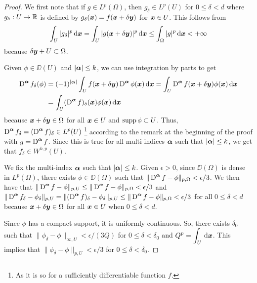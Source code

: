 \begin{proof}
We first note that if $\displaystyle g \in L^p(\Omega)$, then
$\displaystyle g_\delta \in L^p(U)$ for $0 \leq \delta <d$ where
$g_\delta:U \to \mathbb{R}$ is defined by
$g_\delta({\bm{x}}) = f({\bm{x}} + \delta {\bm{y}})$
for ${\bm{x}} \in U$.  This follows from
\[
\int_U |g_\delta|^p \,\mathrm{d}{{\bm{x}}}
= \int_U |g({\bm{x}} + \delta{\bm{y}})|^p \,\mathrm{d}{{\bm{x}}}
\leq \int_{\Omega} |g|^p \,\mathrm{d}{{\bm{x}}} < +\infty
\]
because $\delta {\bm{y}} + U \subset \Omega$.

Given $\phi \in \DD(U)$ and $|{\bm{\alpha}}| \leq k$, we can use integration by
parts to get
\begin{align*}
\operatorname{D}^{{\bm{\alpha}}} f_\delta (\phi)
&= (-1)^{|{\bm{\alpha}}|} \int_U f({\bm{x}}+\delta{\bm{y}})
\operatorname{D}^{{\bm{\alpha}}} \phi({\bm{x}}) \,\mathrm{d}{{\bm{x}}}
= \int_U \operatorname{D}^{{\bm{\alpha}}} f({\bm{x}}+\delta{\bm{y}}) \phi({\bm{x}})
\,\mathrm{d}{{\bm{x}}} \\
&= \int_U (\operatorname{D}^{{\bm{\alpha}}} f)_\delta({\bm{x}}) \phi({\bm{x}}) \,\mathrm{d}{{\bm{x}}}
\end{align*}
because ${\bm{x}}+\delta{\bm{y}} \in \Omega$ for all ${\bm{x}} \in U$
and $\operatorname{supp} \phi \subset U$.  Thus, 
$\displaystyle \operatorname{D}^{{\bm{\alpha}}} f_\delta
= (\operatorname{D}^{{\bm{\alpha}}} f)_\delta \in L^p(U)$
\footnote{As it is so for a sufficiently differentiable function $f$.}
according to the remark at the beginning of the proof with
$\displaystyle g = \operatorname{D}^{{\bm{\alpha}}} f$.  Since this is true for all
multi-indices ${\bm{\alpha}}$ such that $|{\bm{\alpha}}|\leq k$, we get that
$\displaystyle f_\delta \in W^{k,p}(U)$.

We fix the multi-index ${\bm{\alpha}}$ such that $|{\bm{\alpha}}|\leq k$.
Given $\epsilon >0$, since $\DD(\Omega)$ is dense in
$\displaystyle L^p(\Omega)$, there exists $\phi \in \DD(\Omega)$
such that
$\displaystyle \|\operatorname{D}^{{\bm{\alpha}}} f - \phi\|_{p,\Omega} < \epsilon/3$.
We then have that
$\displaystyle \|\operatorname{D}^{{\bm{\alpha}}} f - \phi\|_{p,U} \leq
\|\operatorname{D}^{{\bm{\alpha}}} f - \phi\|_{p,\Omega} < \epsilon/3$
and
$\displaystyle \|\operatorname{D}^{{\bm{\alpha}}} f_\delta - \phi_\delta \|_{p,U}
= \| (\operatorname{D}^{{\bm{\alpha}}} f)_\delta - \phi_\delta \|_{p,U}
\leq \|\operatorname{D}^{{\bm{\alpha}}} f - \phi\|_{p,\Omega} < \epsilon/3$
for all $0\leq \delta < d$
because ${\bm{x}}+\delta{\bm{y}} \in \Omega$ for all ${\bm{x}} \in U$
when $0\leq \delta < d$.

Since $\phi$ has a compact support, it is uniformly continuous.
So, there exists $\delta_0$ such that
$\| \phi_\delta - \phi\|_{\infty,U} < \epsilon/(3Q)$
for $0 \leq \delta < \delta_0$ and
$\displaystyle Q^p = \int_U \,\mathrm{d}{{\bm{x}}}$.  This implies that
$\| \phi_\delta - \phi\|_{p,U} < \epsilon/3$ for $0\leq \delta < \delta_0$.


\end{proof}
